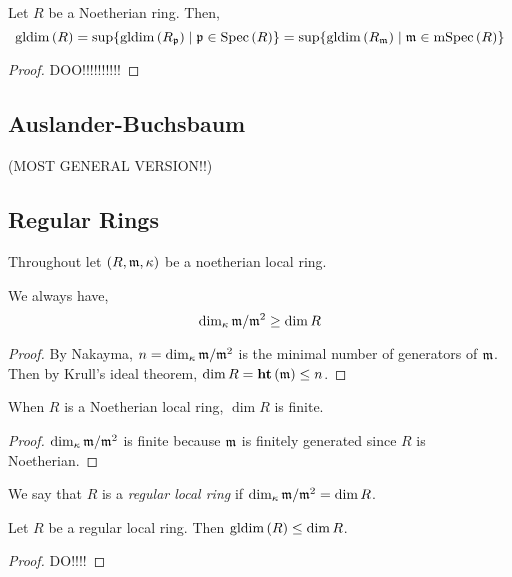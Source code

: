 \documentclass[12pt]{article}
\begin{document}
\begin{prop}
Let $R$ be a Noetherian ring. Then,
\[ \mathrm{gldim}\left( R \right) = \sup \{ \mathrm{gldim}\left( R_{\mathfrak{p}} \right) \mid \mathfrak{p} \in \mathrm{Spec}\left( R \right) \} = \sup \{ \mathrm{gldim}\left( R_{\mathfrak{m}} \right) \mid \mathfrak{m} \in \mathrm{mSpec}\left( R \right) \} \]
\end{prop}

\begin{proof}
DOO!!!!!!!!!!
\end{proof}

\subsection{Auslander-Buchsbaum}

(MOST GENERAL VERSION!!)

\subsection{Regular Rings}

\begin{rmk}
Throughout let $(R, \mathfrak{m}, \kappa)$ be a noetherian local ring. 
\end{rmk}

\begin{lemma}
We always have,
\[ \dim_\kappa \mathfrak{m} / \mathfrak{m}^2 \ge \dim{R} \]
\end{lemma}

\begin{proof}
By Nakayma, $n = \dim_\kappa \mathfrak{m} / \mathfrak{m}^2$ is the minimal number of generators of $\mathfrak{m}$.   Then by Krull's ideal theorem, $\dim{R} = \mathbf{ht}\left( \mathfrak{m} \right) \le n$.
\end{proof}

\begin{cor}
When $R$ is a Noetherian local ring, $\dim{R}$ is finite.
\end{cor}

\begin{proof}
$\dim_\kappa \mathfrak{m} / \mathfrak{m}^2$ is finite because $\mathfrak{m}$ is finitely generated since $R$ is Noetherian.
\end{proof}

\begin{defn}
We say that $R$ is a \textit{regular local ring} if $\dim_\kappa \mathfrak{m} / \mathfrak{m}^2 = \dim{R}$.
\end{defn}

\begin{prop}
Let $R$ be a regular local ring. Then $\mathrm{gldim}\left( R \right) \le \dim{R}$.
\end{prop}

\begin{proof}
DO!!!!
\end{proof}
\end{document}
